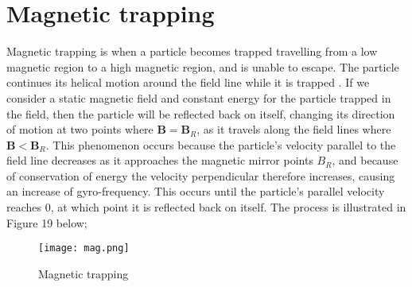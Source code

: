 \documentclass[14paper,11pt,hidelinks]{article}
\begin{document}
\section{Magnetic trapping}
Magnetic trapping is when a particle becomes trapped travelling from a low magnetic region to a high magnetic region, and is unable to escape. The particle continues its helical motion around the field line while it is trapped  \citep{roederer_dynamics_2014}. If we consider a static magnetic field and constant energy for the particle trapped in the field, then the particle will be reflected back on itself, changing its direction of motion at two points where \begin{math} \mathbf{B}=\mathbf{B}_R \end{math}, as it travels along the field lines where \begin{math} \mathbf{B} <\mathbf{B}_R \end{math}. This phenomenon occurs because the particle's velocity parallel to the field line decreases as it approaches the magnetic mirror points \begin{math} B_R \end{math}, and because of conservation of energy the velocity perpendicular therefore increases, causing an increase of gyro-frequency. This occurs until the particle's parallel velocity reaches 0, at which point it is reflected back on itself. The process is illustrated in Figure 19 below;
\newline
\begin{figure}[!ht]
\centering
\texttt{[image: mag.png]} 
\caption{ Magnetic trapping}
\end{figure}
\newline
\FloatBarrier


\end{document}
